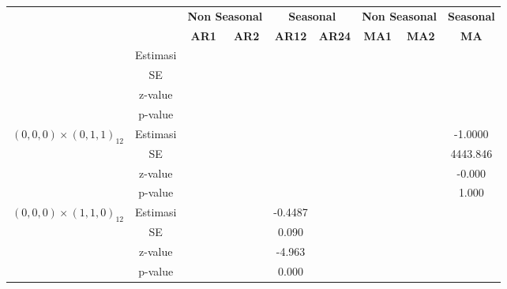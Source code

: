 \begin{enumerate}[label=\alph*.]
\begin{longtable}{|c|c|c|c|c|c|c|c|c|}
            & &
            \multicolumn{2}{c|}{\textbf{Non Seasonal}} &
            \multicolumn{2}{c|}{\textbf{Seasonal}} &
            \multicolumn{2}{c|}{\textbf{Non Seasonal}} &
            \textbf{Seasonal} \\ \cline{3-9}

            & &
            \textbf{AR1} & \textbf{AR2} &
            \textbf{AR12} & \textbf{AR24} &
            \textbf{MA1} & \textbf{MA2} &
            \textbf{MA} \\ \hline
            \endhead

            \hline
            \endfoot

            \hline
            \endlastfoot


            \hline
            \multirow{4}{*}{$(0,0,0)\times(0,1,0)_{12}$}
            & Estimasi & {} & {} & {} & {} & {} & {} & {} \\ \cline{2-9}
            & SE       & {} & {} & {} & {} & {} & {} & {}\\ \cline{2-9}
            & z-value  &  {}   & {} & {} & {} & {} & {} & {} \\ \cline{2-9}
            & p-value  & {} & {} & {} & {} & {} & {} & {} \\ \hline

            \multirow{4}{*}{$(0,0,0)\times(0,1,1)_{12}$}
            & Estimasi & {} & {} & {} & {} & {} & {} & -1.0000 \\ \cline{2-9}
            & SE       & {} & {} & {} & {} & {} & {} & 4443.846\\ \cline{2-9}
            & z-value  &  {}   & {} & {} & {} & {} & {} & -0.000 \\ \cline{2-9}
            & p-value  & {} & {} & {} & {} & {} & {} & 1.000 \\ \hline

            \multirow{4}{*}{$(0,0,0)\times(1,1,0)_{12}$}
            & Estimasi & {} & {} & -0.4487 & {} & {} & {} & {} \\ \cline{2-9}
            & SE       & {} & {} & 0.090 & {} & {} & {} & {}\\ \cline{2-9}
            & z-value  & {} & {} & -4.963 & {} & {} & {} & {}\\ \cline{2-9}
            & p-value  & {} & {} & 0.000 & {} & {} & {} & {}\\ \hline


\end{longtable}
\end{enumerate}
